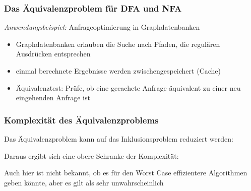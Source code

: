 \documentclass[onlymath]{beamer}
\begin{document}
\begin{frame}\frametitle{Das Äquivalenzproblem für DFA und NFA}


\emph{Anwendungsbeispiel:}
Anfrageoptimierung in Graphdatenbanken
\begin{itemize}
\item Graphdatenbanken erlauben die Suche nach Pfaden, die regulären Ausdrücken entsprechen
\item einmal berechnete Ergebnisse werden zwischengespeichert (Cache)
\item Äquivalenztest: Prüfe, ob eine gecachete Anfrage äquivalent zu einer neu eingehenden Anfrage ist
\end{itemize}

\end{frame}

\begin{frame}\frametitle{Komplexität des Äquivalenzproblems}

Das Äquivalenzproblem kann auf das Inklusionsproblem reduziert werden:\\[1ex]

\bigskip

Daraus ergibt sich eine obere Schranke der Komplexität:


Auch hier ist nicht bekannt, ob es für den Worst Case effizientere Algorithmen geben könnte, aber es gilt als sehr unwahrscheinlich

\end{frame}
\end{document}

